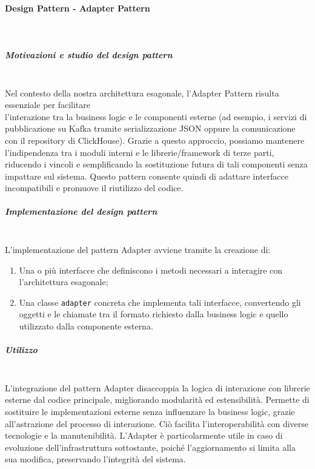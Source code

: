 \documentclass[10pt]{article}
\newcommand{\myparagraph}[1]{\paragraph{#1}\mbox{}\\}
\newcommand{\mysubparagraph}[1]{\subparagraph{#1}\mbox{}\\}
\begin{document}
    \myparagraph{Design Pattern - Adapter Pattern}
    \mysubparagraph{Motivazioni e studio del design pattern}
    Nel contesto della nostra architettura esagonale, l’Adapter Pattern risulta essenziale per facilitare\\ l’interazione tra la business logic e le componenti esterne (ad esempio, i servizi di pubblicazione su Kafka tramite serializzazione JSON oppure la comunicazione con il repository di ClickHouse). Grazie a questo approccio, possiamo mantenere l'indipendenza tra i moduli interni e le librerie/framework di terze parti, riducendo i vincoli e semplificando la sostituzione futura di tali componenti senza impattare sul sistema. Questo pattern consente quindi di adattare interfacce incompatibili e promuove il riutilizzo del codice.
    
    \mysubparagraph{Implementazione del design pattern}
    L’implementazione del pattern Adapter avviene tramite la creazione di:
    \begin{enumerate}
        \item Una o più interfacce che definiscono i metodi necessari a interagire con l’architettura esagonale;
        \item Una classe \texttt{adapter} concreta che implementa tali interfacce, convertendo gli oggetti e le chiamate tra il formato richiesto dalla business logic e quello utilizzato dalla componente esterna.
    \end{enumerate}

    \mysubparagraph{Utilizzo}
    L’integrazione del pattern Adapter disaccoppia la logica di interazione con librerie esterne dal codice principale, migliorando modularità ed estensibilità. Permette di sostituire le implementazioni esterne senza influenzare la business logic, grazie all'astrazione del processo di interazione. Ciò facilita l'interoperabilità con diverse tecnologie e la manutenibilità. L'Adapter è particolarmente utile in caso di evoluzione dell'infrastruttura sottostante, poiché l'aggiornamento si limita alla sua modifica, preservando l'integrità del sistema.
    
\end{document}
